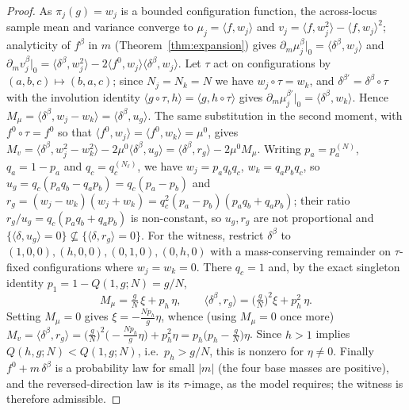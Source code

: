 \documentclass[11pt]{article}
\theoremstyle{plain}
\theoremstyle{definition}
\theoremstyle{remark}
\begin{document}
\begin{proof}
As $\pi_j(g)=w_j$ is a bounded configuration function, the across-locus sample mean and variance
converge to $\mu_j=\langle f,w_j\rangle$ and $v_j=\langle f,w_j^2\rangle-\langle f,w_j\rangle^2$;
analyticity of $f^\beta$ in $m$ (Theorem~\ref{thm:expansion}) gives
$\partial_m\mu_j^\beta|_0=\langle\delta^\beta,w_j\rangle$ and
$\partial_m v_j^\beta|_0=\langle\delta^\beta,w_j^2\rangle-2\langle f^0,w_j\rangle\langle\delta^\beta,w_j\rangle$.
Let $\tau$ act on configurations by $(a,b,c)\mapsto(b,a,c)$; since $N_j=N_k=N$ we have
$w_j\!\circ\!\tau=w_k$, and $\delta^{\beta'}=\delta^{\beta}\!\circ\!\tau$ with the involution
identity $\langle g\!\circ\!\tau,h\rangle=\langle g,h\!\circ\!\tau\rangle$ gives
$\partial_m\mu_j^{\beta'}|_0=\langle\delta^\beta,w_k\rangle$. Hence
$M_\mu=\langle\delta^\beta,w_j-w_k\rangle=\langle\delta^\beta,u_g\rangle$. The same substitution
in the second moment, with $f^0\!\circ\!\tau=f^0$ so that
$\langle f^0,w_j\rangle=\langle f^0,w_k\rangle=\mu^0$, gives
$M_v=\langle\delta^\beta,w_j^2-w_k^2\rangle-2\mu^0\langle\delta^\beta,u_g\rangle
=\langle\delta^\beta,r_g\rangle-2\mu^0 M_\mu$.
Writing $p_a=p^{(N)}_a$, $q_a=1-p_a$ and $q_c=q^{(N_\ell)}_c$, we have $w_j=p_aq_bq_c$,
$w_k=q_ap_bq_c$, so $u_g=q_c(p_aq_b-q_ap_b)=q_c(p_a-p_b)$ and
$r_g=(w_j-w_k)(w_j+w_k)=q_c^2(p_a-p_b)(p_aq_b+q_ap_b)$; their ratio
$r_g/u_g=q_c(p_aq_b+q_ap_b)$ is non-constant, so $u_g,r_g$ are not proportional and
$\{\langle\delta,u_g\rangle=0\}\not\subseteq\{\langle\delta,r_g\rangle=0\}$. For the witness,
restrict $\delta^\beta$ to $(1,0,0),(h,0,0),(0,1,0),(0,h,0)$ with a mass-conserving remainder on
$\tau$-fixed configurations where $w_j=w_k=0$. There $q_c=1$ and, by the exact singleton
identity $p_1=1-Q(1,g;N)=g/N$,
\[
M_\mu=\tfrac{g}{N}\,\xi+p_h\,\eta,\qquad
\langle\delta^\beta,r_g\rangle=\big(\tfrac{g}{N}\big)^2\xi+p_h^2\,\eta .
\]
Setting $M_\mu=0$ gives $\xi=-\tfrac{Np_h}{g}\eta$, whence (using $M_\mu=0$ once more)
$M_v=\langle\delta^\beta,r_g\rangle=\big(\tfrac{g}{N}\big)^2\big(\!-\tfrac{Np_h}{g}\eta\big)+p_h^2\eta
=p_h\big(p_h-\tfrac{g}{N}\big)\eta$. Since $h>1$ implies $Q(h,g;N)<Q(1,g;N)$, i.e.\ $p_h>g/N$,
this is nonzero for $\eta\neq0$. Finally $f^0+m\,\delta^\beta$ is a probability law for small
$|m|$ (the four base masses are positive), and the reversed-direction law is its $\tau$-image, as
the model requires; the witness is therefore admissible.
\end{proof}
\end{document}
